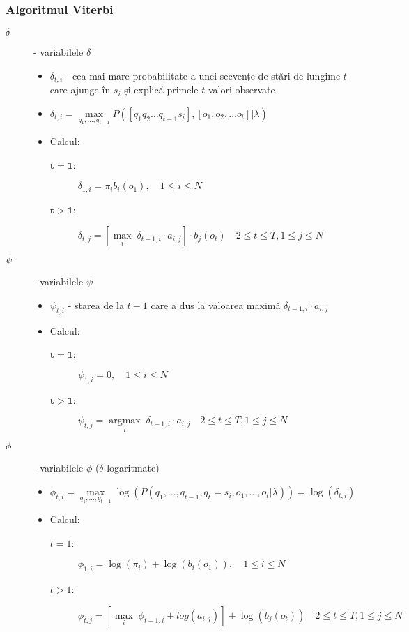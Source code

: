 \documentclass[12pt]{article}
\begin{document}
\subsubsection{Algoritmul Viterbi}
\label{sec:viterbi}

\begin{description}
\item[$\delta$] - variabilele $\delta$
  \begin{itemize}
  \item $\delta_{t,i}$ - cea mai mare probabilitate a unei secvențe de
    stări de lungime $t$ care ajunge în $s_i$ și explică primele $t$
    valori observate
  \item
    $\delta_{t,i}=\underset{q_1,\ldots,q_{t-1}}{\operatorname{max}}
    P([q_1 q_2 \ldots q_{t-1} s_i], [o_1, o_2, \ldots o_t] \vert
    \lambda)$
  \item Calcul:
    \begin{description}
    \item[$\mathbf{t=1}$:] $\delta_{1,i} = \pi_{i}b_i(o_1),
      \scriptstyle{\quad 1 \le i \le N}$
    \item[$\mathbf{t>1}$:] $\delta_{t,j} = [\underset{i
      }{\operatorname{max}}\; \delta_{t-1,i} \cdot a_{i,j}] \cdot
      b_{j}(o_{t}) \quad \scriptstyle{2 \le t \le T, 1 \le j \le N}$
    \end{description}
  \end{itemize}
\item[$\psi$] - variabilele $\psi$
  \begin{itemize}
  \item $\psi_{t,i}$ - starea de la $t-1$ care a dus la valoarea
    maximă $\delta_{t-1,i}\cdot a_{i,j}$
  \item Calcul:
    \begin{description}
    \item[$\mathbf{t=1}$:] $\psi_{1,i} = 0, \quad\scriptstyle{1 \le i
        \le N}$
    \item[$\mathbf{t>1}$:] $\psi_{t,j} =
      \underset{i}{\operatorname{argmax}}\; \delta_{t-1,i}\cdot
      a_{i,j} \quad \scriptstyle{2 \le t \le T, 1 \le j \le N}$
    \end{description}
  \end{itemize}
\item[$\phi$] - variabilele $\phi$ ($\delta$ logaritmate)
  \begin{itemize}
  \item $\phi_{t,i}=\underset{q_1,\ldots,q_{t-1}}{\operatorname{max}}
    \log(P(q_1,\ldots,q_{t-1},q_t=s_i,o_1,\ldots,o_t\vert
    \lambda))=\log(\delta_{t,i})$
  \item Calcul:
    \begin{description}
    \item[$t=1$:] $\phi_{1,i} = \log(\pi_{i}) + \log(b_i(o_1)),
      \quad\scriptstyle{1 \le i \le N}$
    \item[$t>1$:] $\phi_{t,j} = [\underset{i}{\operatorname{max}}\; \phi_{t-1,i} +
        log(a_{i,j})] + \log(b_{j}(o_{t}))
        \quad \scriptstyle{2 \le t \le T, 1 \le j \le N}$
    \end{description}
  \end{itemize}
\end{description}
\end{document}
